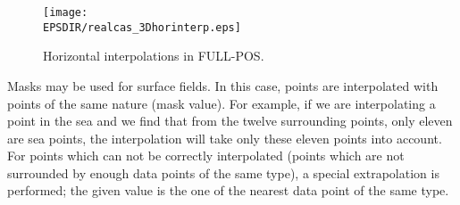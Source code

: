 \begin{figure}[!ht]
\centerline{\texttt{[image: \\EPSDIR/realcas\_3Dhorinterp.eps]}}
\caption{Horizontal interpolations in FULL-POS.
\label{3Dhorinterp}}
\end{figure}

Masks may be used for surface fields. In this case, points are interpolated with
points of the same nature (mask value). For example, if we are interpolating a
point in the sea and we find that from the twelve surrounding points, only eleven
are sea points, the interpolation will take only these eleven points into account.
\\
For points which can not be correctly interpolated (points which are not surrounded
by enough data points of the same type), a special extrapolation is performed; the
given value is the one of the nearest data point of the same type.

